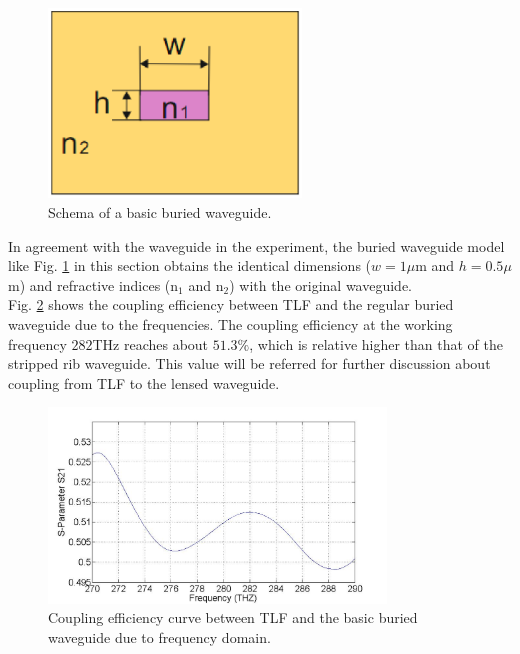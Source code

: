 \begin{figure}[!ht]
\centering
\includegraphics[width=0.6\textwidth]{bilder/buried_waveguide}
\caption{Schema of a basic buried waveguide.}
\label{fig:buried_waveguide}
\end{figure}
In agreement with the waveguide in the experiment, the buried waveguide model like Fig. \ref{fig:buried_waveguide} in this section obtains the identical dimensions ($w=1\mu$m and $h=0.5\mu$m) and refractive indices (n$_{1}$ and n$_{2}$) with the original waveguide.\\ 
Fig. \ref{fig:curve_coupling_basic_buried_waveguide} shows the coupling efficiency between TLF and the regular buried waveguide due to the frequencies. The coupling efficiency at the working frequency $282$THz reaches about $51.3\%$, which is relative higher than that of the stripped rib waveguide. This value will be referred for further discussion about coupling from TLF to the lensed waveguide.  
\begin{figure}[!ht]
\centering
\includegraphics[width=0.8\textwidth]{bilder/s21_sym_waveguide}
\caption{Coupling efficiency curve between TLF and the basic buried waveguide due to frequency domain.}
\label{fig:curve_coupling_basic_buried_waveguide}
\end{figure}
